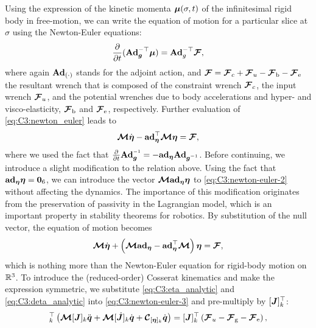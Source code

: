%
\noindent Using the expression of the kinetic momenta $\boldsymbol{\mu}(\sigma,t)$ of the infinitesimal rigid body in free-motion, we can write the equation of motion for a particular slice at $\sigma$ using the Newton-Euler equations:
%
\begin{equation}
\frac{\partial }{\partial t} (\textbf{Ad}_{{\boldsymbol{g}}}^{-\top} \boldsymbol{\mu}) = \textbf{Ad}_{g}^{-\top}\boldsymbol{\mathcal{F}},\label{eq:C3:newton_euler}
\end{equation}
%
where again $\textbf{Ad}_{(\cdot)}$ stands for the adjoint action, and $\boldsymbol{\mathcal{F}} = \boldsymbol{\mathcal{F}}_c  + \boldsymbol{\mathcal{F}}_u - \boldsymbol{\mathcal{F}}_\textrm{b} - \boldsymbol{\mathcal{F}}_{\scriptstyle\textrm{e}}$ the resultant wrench that is composed of the constraint wrench $\boldsymbol{\mathcal{F}}_c$, the input wrench $\boldsymbol{\mathcal{F}}_u$, and the potential wrenches due to body accelerations and hyper- and visco-elasticity, $\boldsymbol{\mathcal{F}}_\textrm{b}$ and $\boldsymbol{\mathcal{F}}_{\scriptstyle\textrm{e}}$, respectively. Further evaluation of \eqref{eq:C3:newton_euler} leads to
%
\begin{equation}
{\boldsymbol{\mathcal{M}}}\dot{\boldsymbol{\eta}} - \textbf{ad}_{\boldsymbol{\eta}}^\top {\boldsymbol{\mathcal{M}}} \boldsymbol{\eta} = \boldsymbol{\mathcal{F}},
\label{eq:C3:newton-euler-2}
\end{equation}
%
where we used the fact that $\tfrac{\p}{\p t}{\Ad}_{\vec{g}} \inv = -\ad_{\vec{\eta}} {\Ad}_{\vec{g} \inv}$. Before continuing, we introduce a slight modification to the relation above. Using the fact that $\textbf{ad}_{\boldsymbol{\eta}} \boldsymbol{\eta} = \boldsymbol{0}_6$, we can introduce the vector
$\boldsymbol{\mathcal{M}} \textbf{ad}_{\boldsymbol{\eta}} \boldsymbol{\eta}$ to \eqref{eq:C3:newton-euler-2} without affecting the dynamics. The importance of this modification originates from the preservation of passivity in the Lagrangian model, which is an important property in stability theorems for robotics. By substitution of the null vector, the equation of motion becomes
%
\begin{equation}
  {\boldsymbol{\mathcal{M}}} \dot{\boldsymbol{\eta}} + \left({\boldsymbol{\mathcal{M}}} \textbf{ad}_{\boldsymbol{\eta}}  - \textbf{ad}_{\boldsymbol{\eta}} ^\top {\boldsymbol{\mathcal{M}}} \right) \boldsymbol{\eta} = {\boldsymbol{\mathcal{F}}},
  \label{eq:C3:newton-euler-3}
\end{equation}
%
which is nothing more than the Newton-Euler equation for rigid-body motion on $\mathbb{R}^3$. To introduce the (reduced-order) Cosserat kinematics and make the expression symmetric, we substitute \eqref{eq:C3:eta_analytic} and \eqref{eq:C3:deta_analytic} into \eqref{eq:C3:newton-euler-3} and pre-multiply by $[{\boldsymbol{J}}]_k^\top$:
%
\begin{align}
  [\vec{J}]_k^\top \left( \MT [\mat{J}]_k \ddot{\vec{q}} + \MT [\dJB]_k\dot{\vec{q}} + \CT_{[\vec{\eta}]_k }\dot{\vec{q}}\right) = [\mat{J}]_k^\top \left(\FT_u - \FT\grav - \FT\elastic \right),
  \label{eq:C3:projected_NE_jacobian}
\end{align}
